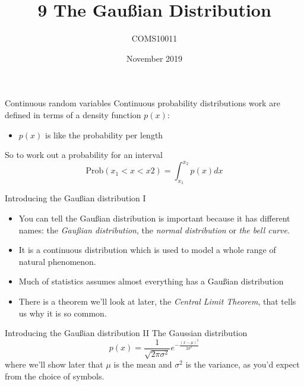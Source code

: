 \documentclass{beamer}
\title[9 The Gau\ss{}ian Distribution]{9 The Gau\ss{}ian Distribution}
\author{COMS10011}
\institute{\texttt{coms10011.github.io}}
\date{November 2019}
\begin{document}
\maketitle



\begin{frame}{Continuous random variables}
\color{black}
Continuous probability distributions work are defined
in terms of a density function \color{reddish}$p(x)$\color{black}:
\begin{itemize}
\item \color{reddish}$p(x)$\color{black} is like the probability per length
\end{itemize}
So to work out a probability for an interval
\color{reddish}
$$
\mbox{Prob}(x_1<x<x2)=\int_{x_1}^{x_2} p(x)dx
$$
\color{black}
\end{frame}

\begin{frame}{Introducing the Gau\ss{}ian distribution I}
\color{black}
\begin{itemize}
\item You can tell the Gau\ss{}ian distribution is important because it has different names: the \textsl{Gau\ss{}ian distribution}, the \textsl{normal distribution} or \textsl{the bell curve}.
\item It is a continuous distribution which is used to model a whole range of
natural phenomenon.
\item Much of statistics assumes almost everything has a Gau\ss{}ian distribution
\item There is a theorem we'll look at later, the \textsl{Central Limit Theorem}, that tells us why it is so common.
\end{itemize}
\end{frame}



\begin{frame}{Introducing the Gau\ss{}ian distribution II}
The Gaussian distribution
\color{purple}
$$
p(x)=\frac{1}{\sqrt{2\pi\sigma^2}}e^{-\frac{(x-\mu)^2}{2\sigma^2}}
$$
\color{black} where we'll show later that
\color{reddish}$\mu$\color{black}{} is the mean and
\color{reddish}$\sigma^2$\color{black}{}  is the variance, as you'd
expect from the choice of symbols.
\end{frame}
\end{document}
